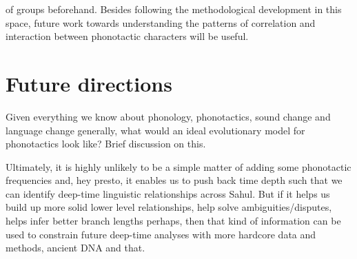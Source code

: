 of groups beforehand. Besides following the methodological development in this space, future work towards understanding the patterns of correlation and interaction between phonotactic characters will be useful.

\hypertarget{future-directions}{%
\section{Future directions}\label{future-directions}}

Given everything we know about phonology, phonotactics, sound change and language change generally, what would an ideal evolutionary model for phonotactics look like? Brief discussion on this.

Ultimately, it is highly unlikely to be a simple matter of adding some phonotactic frequencies and, hey presto, it enables us to push back time depth such that we can identify deep-time linguistic relationships across Sahul. But if it helps us build up more solid lower level relationships, help solve ambiguities/disputes, helps infer better branch lengths perhaps, then that kind of information can be used to constrain future deep-time analyses with more hardcore data and methods, ancient DNA and that.
